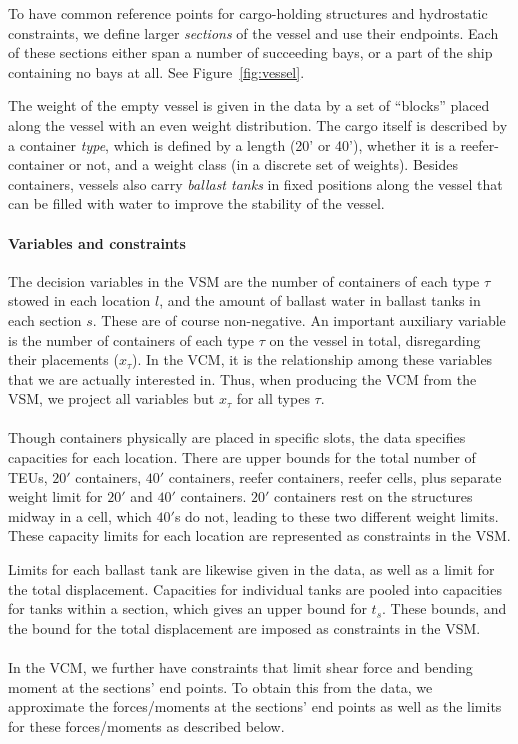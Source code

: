 \documentclass{llncs}
\begin{document}
To have common reference points for cargo-holding structures and hydrostatic constraints, we define larger \emph{sections} of the vessel and use their endpoints. Each of these sections either span a number of succeeding bays, or a part of the ship containing no bays at all.
See Figure~\ref{fig:vessel}.

The weight of the empty vessel is given in the data by a set of ``blocks'' placed along the vessel with an even weight distribution.
%
The cargo itself is described by a container \emph{type}, which is defined by a length (20' or 40'), whether it is a reefer-container or not, and a weight class (in a discrete set of weights). 
Besides containers, vessels also carry \emph{ballast tanks} in fixed positions along the vessel that can be filled with water to improve the stability of the vessel.

\paragraph{Variables and constraints}
The decision variables in the VSM are the number of containers of each type $\tau$ stowed in each location $l$, and the amount of ballast water in ballast tanks in each section $s$. These are of course non-negative.
%
An important auxiliary variable is the number of containers of each type $\tau$ on the vessel in total, disregarding their placements ($x_\tau$). In the VCM, it is the relationship among these variables that we are actually interested in. Thus, when producing the VCM from the VSM, we project all variables but $x_\tau$ for all types $\tau$.  
%
\\\\
Though containers physically are placed in specific slots, the data specifies capacities for each location.
There are upper bounds for the total number of TEUs, $20'$ containers, $40'$ containers, reefer containers, reefer cells, plus {separate weight limit for $20'$ and $40'$ containers}. $20'$ containers rest on the structures midway in a cell, which $40'$s do not, leading to these two different weight limits. 
These capacity limits for each location are represented as constraints in the VSM.
%

Limits for each ballast tank are likewise given in the data, as well as a limit for the total displacement. 
Capacities for individual tanks are pooled into capacities for tanks within a section, which gives an upper bound for $t_s$. These bounds, and the bound for the total displacement are imposed as constraints in the VSM.
\\\\
In the VCM, we further have constraints that limit shear force and bending moment at the sections' end points. To obtain this from the data, we approximate the forces/moments at the sections' end points as well as the limits for these forces/moments as described below. 
\end{document}
